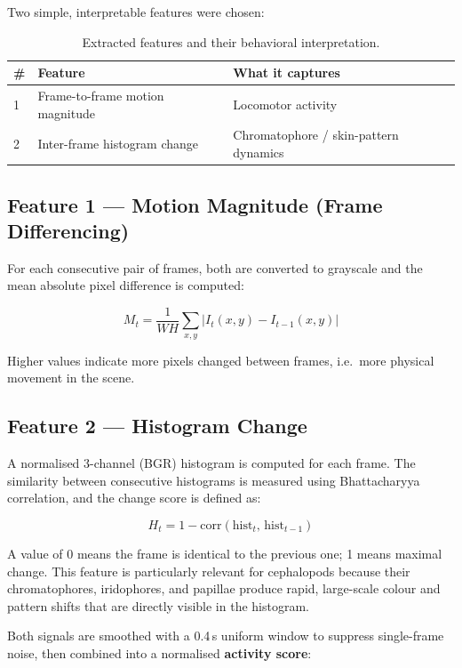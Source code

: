 \documentclass[12pt,a4paper]{article}
\begin{document}
Two simple, interpretable features were chosen:

\begin{table}[H]
    \centering
    \begin{tabular}{lll}
        \toprule
        \textbf{\#} & \textbf{Feature} & \textbf{What it captures} \\
        \midrule
        1 & Frame-to-frame motion magnitude & Locomotor activity \\
        2 & Inter-frame histogram change & Chromatophore / skin-pattern dynamics \\
        \bottomrule
    \end{tabular}
    \caption{Extracted features and their behavioral interpretation.}
\end{table}

\subsection{Feature 1 — Motion Magnitude (Frame Differencing)}

For each consecutive pair of frames, both are converted to grayscale and the
mean absolute pixel difference is computed:

\[
    M_t = \frac{1}{WH} \sum_{x,y} \left| I_t(x,y) - I_{t-1}(x,y) \right|
\]

Higher values indicate more pixels changed between frames, i.e.\ more
physical movement in the scene.

\subsection{Feature 2 — Histogram Change}

A normalised 3-channel (BGR) histogram is computed for each frame. The
similarity between consecutive histograms is measured using Bhattacharyya
correlation, and the change score is defined as:

\[
    H_t = 1 - \text{corr}(\text{hist}_{t},\, \text{hist}_{t-1})
\]

A value of 0 means the frame is identical to the previous one; 1 means
maximal change. This feature is particularly relevant for cephalopods because
their chromatophores, iridophores, and papillae produce rapid, large-scale
colour and pattern shifts that are directly visible in the histogram.

Both signals are smoothed with a 0.4\,s uniform window to suppress
single-frame noise, then combined into a normalised \textbf{activity score}:
\end{document}
